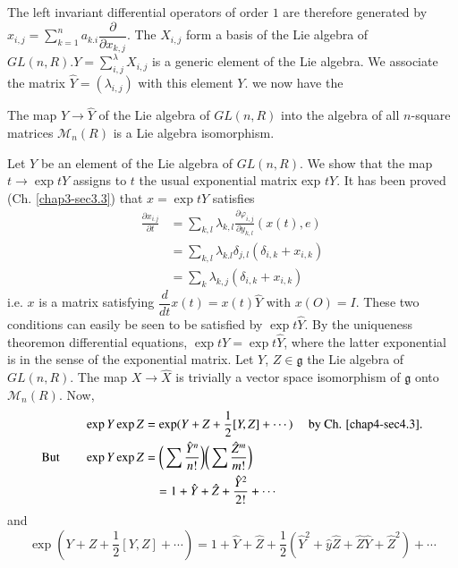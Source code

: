 The left invariant differential operators of order $1$ are therefore
generated  
by $ x_{i,j} = \sum\limits^{n}_{k=1}a_{k.i} \dfrac{\partial}{\partial
  x_{k,j}}$. The $ X_{i,j}$ form a basis of the Lie algebra of
$GL(n,R). Y = \sum_{i,j}^{\lambda}X_{i,j}$ is a generic element of the
Lie algebra. We associate the matrix $\hat{Y}= (\lambda_{i,j})$
with this element $Y$. we now have 
the 

\begin{proposition}\label{chap4-prop2}%
 The map $Y \rightarrow \hat{Y}$ of the Lie algebra of $GL(n,R)$
 into the algebra of all $n$-square matrices $\mathscr{M}_n(R)$ is a
 Lie algebra isomorphism.  
\end{proposition}

Let $Y$ be an element of the Lie algebra of $GL(n,R)$. We show that
the map $t \rightarrow \exp t  Y$ assigns to $t$ the  usual
exponential matrix exp $t Y$. It has been proved (Ch. \ref{chap3-sec3.3}) that $ x
=\exp t Y$ satisfies 
\begin{align*}
\frac{\partial x_{i.j}}{\partial t}& =\sum\limits_{k,l} \lambda_{k,l}
\frac{\partial \varphi_{i,j}}{\partial y_{k,l}} (x(t),e)\\ 
&=\sum\limits_{k,l} \lambda_{k.l} \delta_{j,l} (\delta
_{i,k}+x_{i,k})\\ 
&=\sum\limits_{k} \lambda_{k,j}(\delta_{i,k}+x_{i,k})
\end{align*}
i.e. $x$ is a matrix satisfying $\dfrac{d}{dt}x(t) =x(t) \hat{Y}$
with $x(O) =I$. These two conditions can easily be seen to be
satisfied by  $\exp t \hat{Y}$.  By the uniqueness 
theorem\pageoriginale on differential equations, $\exp tY= \exp t
\hat{Y}$, where the latter exponential is in the sense of the exponential
matrix. Let $Y$, $Z \in \mathfrak{g}$ the Lie algebra of $GL(n,R)$. The
map $X \rightarrow \hat{X} $ is trivially a vector space
isomorphism of $\mathfrak{g}$ onto $\mathscr{M}_n(R)$. Now, 
\begin{align*}
& \exp Y \exp Z = \exp (Y+Z+\frac{1}{2}[Y,Z]
  +\cdots) \quad\text{ by Ch. \ref{chap4-sec4.3}.}\\ 
\text{But} \qquad &   \exp Y \exp Z = \bigg(\sum
\frac{\hat{Y}^n}{n!}\bigg)\bigg(\sum
\frac{\hat{Z}^m}{m!}\bigg)\\ 
& \hspace {2cm }=1+\hat{Y}+\hat{Z}+\frac
     {\hat{Y}^2}{2!}+\cdots
\end{align*}
and
$$
\exp(Y+Z+\frac{1}{2}[Y,Z]+\cdots)
=1+\hat{Y}+\hat{Z}+\frac{1}{2} (\hat
{Y}^2+\hat{y}\hat{Z}+\hat{Z}\hat{Y}+\hat{Z}^2)+\cdots 
$$

